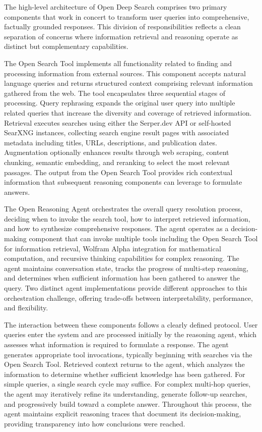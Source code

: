 The high-level architecture of Open Deep Search comprises two primary components that work in concert to transform user queries into comprehensive, factually grounded responses. This division of responsibilities reflects a clean separation of concerns where information retrieval and reasoning operate as distinct but complementary capabilities.

The Open Search Tool implements all functionality related to finding and processing information from external sources. This component accepts natural language queries and returns structured context comprising relevant information gathered from the web. The tool encapsulates three sequential stages of processing. Query rephrasing expands the original user query into multiple related queries that increase the diversity and coverage of retrieved information. Retrieval executes searches using either the Serper.dev API or self-hosted SearXNG instances, collecting search engine result pages with associated metadata including titles, URLs, descriptions, and publication dates. Augmentation optionally enhances results through web scraping, content chunking, semantic embedding, and reranking to select the most relevant passages. The output from the Open Search Tool provides rich contextual information that subsequent reasoning components can leverage to formulate answers.

The Open Reasoning Agent orchestrates the overall query resolution process, deciding when to invoke the search tool, how to interpret retrieved information, and how to synthesize comprehensive responses. The agent operates as a decision-making component that can invoke multiple tools including the Open Search Tool for information retrieval, Wolfram Alpha integration for mathematical computation, and recursive thinking capabilities for complex reasoning. The agent maintains conversation state, tracks the progress of multi-step reasoning, and determines when sufficient information has been gathered to answer the query. Two distinct agent implementations provide different approaches to this orchestration challenge, offering trade-offs between interpretability, performance, and flexibility.

The interaction between these components follows a clearly defined protocol. User queries enter the system and are processed initially by the reasoning agent, which assesses what information is required to formulate a response. The agent generates appropriate tool invocations, typically beginning with searches via the Open Search Tool. Retrieved context returns to the agent, which analyzes the information to determine whether sufficient knowledge has been gathered. For simple queries, a single search cycle may suffice. For complex multi-hop queries, the agent may iteratively refine its understanding, generate follow-up searches, and progressively build toward a complete answer. Throughout this process, the agent maintains explicit reasoning traces that document its decision-making, providing transparency into how conclusions were reached.


